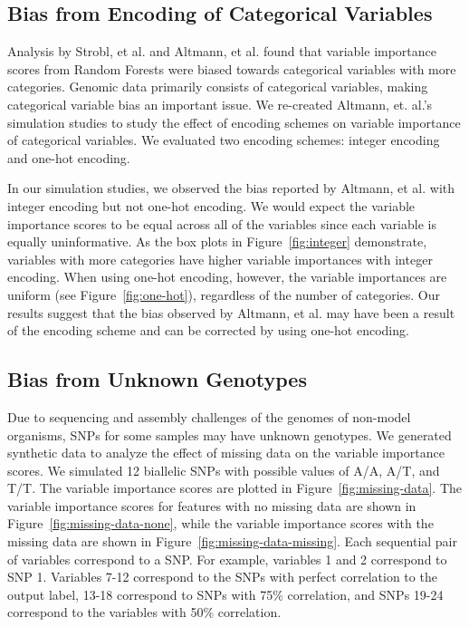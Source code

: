 \subsection{Bias from Encoding of Categorical Variables}
Analysis by Strobl, et al. \cite{Strobl2007} and Altmann, et al. \cite{Altmann2010} found that variable importance scores from Random Forests were biased towards categorical variables with more categories.  Genomic data primarily consists of categorical variables, making categorical variable bias an important issue.  We re-created Altmann, et. al.'s simulation studies to study the effect of encoding schemes on variable importance of categorical variables.  We evaluated two encoding schemes: integer encoding and one-hot encoding. 

In our simulation studies,  we observed the bias reported by Altmann, et al. \cite{Altmann2010} with integer encoding but not one-hot encoding. We would expect the variable importance scores to be equal across all of the variables since each variable is equally uninformative.  As the box plots in Figure~\ref{fig:integer} demonstrate, variables with more categories have higher variable importances with integer encoding.   When using one-hot encoding, however, the variable importances are uniform (see Figure~\ref{fig:one-hot}), regardless of the number of categories.  Our results suggest that the bias observed by Altmann, et al. may have been a result of the encoding scheme and can be corrected by using one-hot encoding.


\subsection{Bias from Unknown Genotypes}
Due to sequencing and assembly challenges of the genomes of non-model organisms, SNPs for some samples may have unknown genotypes.  We generated synthetic data to analyze the effect of missing data on the variable importance scores.  We simulated 12 biallelic SNPs with possible values of A/A, A/T, and T/T. 
The variable importance scores are plotted in Figure~\ref{fig:missing-data}.  The variable importance scores for features with no missing data are shown in Figure~\ref{fig:missing-data-none}, while the variable importance scores with the missing data are shown in Figure~\ref{fig:missing-data-missing}.  Each sequential pair of variables correspond to a SNP.  For example, variables 1 and 2 correspond to SNP 1. Variables 7-12 correspond to the SNPs with perfect correlation to the output label, 13-18 correspond to SNPs with 75\% correlation, and SNPs 19-24 correspond to the variables with 50\% correlation.

